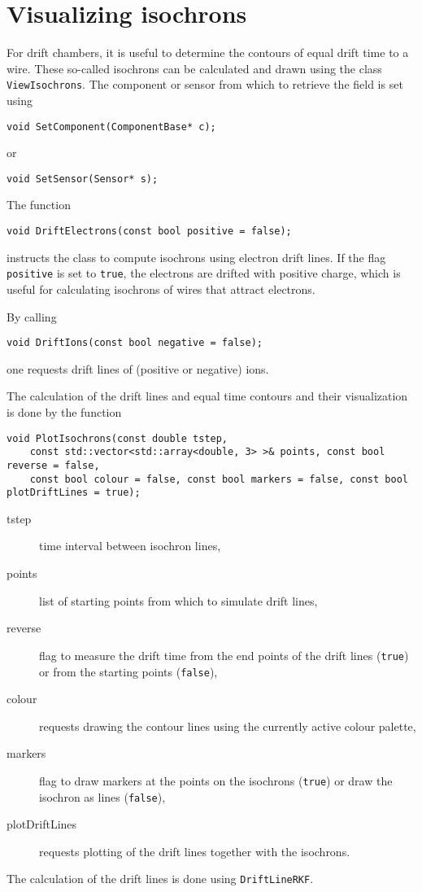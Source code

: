 \section{Visualizing isochrons}

For drift chambers, it is useful to determine the contours of equal drift time to a wire.
These so-called isochrons can be calculated and drawn 
using the class \texttt{ViewIsochrons}.
The component or sensor from which to retrieve the field is set using
\begin{lstlisting}
void SetComponent(ComponentBase* c);
\end{lstlisting}
or
\begin{lstlisting}
void SetSensor(Sensor* s);
\end{lstlisting}

The function
\begin{lstlisting}
void DriftElectrons(const bool positive = false);
\end{lstlisting}
instructs the class to compute isochrons using electron drift lines.
If the flag \texttt{positive} is set to \texttt{true}, the electrons 
are drifted with positive charge,
which is useful for calculating isochrons of wires that attract electrons.

By calling
\begin{lstlisting}
void DriftIons(const bool negative = false);
\end{lstlisting}
one requests drift lines of (positive or negative) ions.

The calculation of the drift lines and equal time contours and their visualization is 
done by the function 
\begin{lstlisting}
void PlotIsochrons(const double tstep,
    const std::vector<std::array<double, 3> >& points, const bool reverse = false,
    const bool colour = false, const bool markers = false, const bool plotDriftLines = true);
\end{lstlisting}
\begin{description}
  \item[tstep] time interval between isochron lines,
  \item[points] list of starting points from which to simulate drift lines,
  \item[reverse] flag to measure the drift time from the end points of the drift lines (\texttt{true}) or from the starting points (\texttt{false}),
  \item[colour] requests drawing the contour lines using the currently active colour palette,
  \item[markers] flag to draw markers at the points on the isochrons (\texttt{true}) or draw the isochron as lines (\texttt{false}), 
  \item[plotDriftLines] requests plotting of the drift lines together with the isochrons. 
\end{description} 
The calculation of the drift lines is done using \texttt{DriftLineRKF}.

